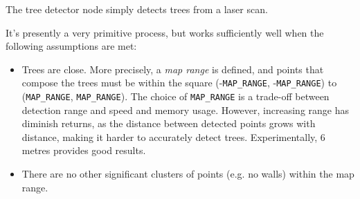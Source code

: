 \documentclass[12pt,oneside,a4paper]{book}
\begin{document}
The tree detector node simply detects trees from a laser scan.

It's presently a very primitive process, but works sufficiently well
when the following assumptions are met:
\begin{itemize}
\item Trees are close. More precisely, a \emph{map range} is defined,
  and points that compose the trees must be within the square
  (-\texttt{MAP\_RANGE}, -\texttt{MAP\_RANGE}) to (\texttt{MAP\_RANGE},
  \texttt{MAP\_RANGE}). The choice of \texttt{MAP\_RANGE} is a trade-off
  between detection range and speed and memory usage. However,
  increasing range has diminish returns, as the distance between
  detected points grows with distance, making it harder to accurately
  detect trees. Experimentally, 6 metres  provides good results.
\item There are no other significant clusters of points (e.g. no
  walls) within the map range.
\end{itemize}
\end{document}
